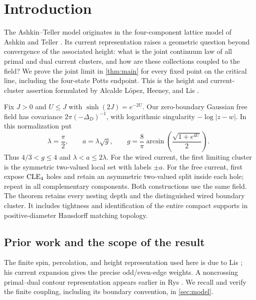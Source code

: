 \section{Introduction}\label{sec:introduction}

The Ashkin--Teller model originates in the four-component lattice model
of Ashkin and Teller \cite{AshkinTeller1943}. Its current representation
raises a geometric question beyond convergence of the associated height:
what is the joint continuum law of all primal and dual current clusters,
and how are these collections coupled to the field? We prove the joint
limit in \cref{thm:main} for every fixed point on the critical line,
including the four-state Potts endpoint. This is the height and
current-cluster assertion formulated by Alcalde L\'opez, Heeney, and Lis
\cite[Conjecture~1.2]{AlcaldeLopezHeeneyLis2026}.

Fix $J>0$ and $U\le J$ with $\sinh(2J)=e^{-2U}$. Our zero-boundary
Gaussian free field has covariance $2\pi(-\Delta_D)^{-1}$, with
logarithmic singularity $-\log|z-w|$. In this normalization put
\[
 \lambda=\frac\pi2,\qquad a=\lambda\sqrt g,\qquad
 g=\frac8\pi\arcsin\!\left(\frac{\sqrt{1+e^{4U}}}{2}\right).
\]
Thus $4/3<g\le4$ and $\lambda<a\le2\lambda$. For the wired current,
the first limiting cluster is the symmetric two-valued local set with
labels $\pm a$. For the free current, first expose $\mathrm{CLE}_4$ holes and
retain an asymmetric two-valued split inside each hole; repeat in all
complementary components. Both constructions use the same field.
The theorem retains every nesting depth and the distinguished wired
boundary cluster. It includes tightness and identification of the entire
compact supports in positive-diameter Hausdorff matching topology.

\subsection*{Prior work and the scope of the result}
The finite spin, percolation, and height representation used here is due
to Lis \cite[Sections~1.1--1.3 and~2.2]{Lis2022Spins}; his current expansion
\cite[Section~2]{Lis2022Boundary} gives the precise odd/even-edge weights.
A noncrossing primal--dual contour representation appears earlier in Rys
\cite[Section~3]{Rys1963}. We recall and verify the finite coupling,
including its boundary convention, in \cref{sec:model}.

